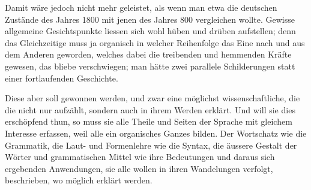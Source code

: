 {Damit wäre jedoch nicht mehr geleistet, als wenn man etwa die deutschen Zustände des Jahres 1800 mit jenen des Jahres 800 vergleichen wollte. Gewisse allgemeine Gesichtspunkte liessen sich wohl hüben und drüben aufstellen; denn das Gleichzeitige muss ja organisch  in welcher Reihenfolge das Eine nach und aus dem Anderen geworden, welches dabei die \label{sp.169} treibenden und hemmenden Kräfte gewesen, das bliebe verschwiegen; man hätte zwei parallele Schilderungen statt einer fortlaufenden Geschichte.

Diese aber soll gewonnen werden, und zwar eine möglichst wissenschaftliche, die die  nicht nur aufzählt, sondern auch in ihrem Werden erklärt. Und will sie dies erschöpfend thun, so muss sie alle Theile und Seiten der Sprache mit gleichem Interesse erfassen, weil alle ein organisches Ganzes bilden. Der Wortschatz wie die Grammatik, die Laut- und Formenlehre wie die Syntax, die äussere Gestalt der Wörter und grammatischen Mittel wie ihre Bedeutungen und daraus sich ergebenden Anwendungen, sie alle wollen in ihren Wandelungen verfolgt, beschrieben, wo möglich erklärt werden.

}
